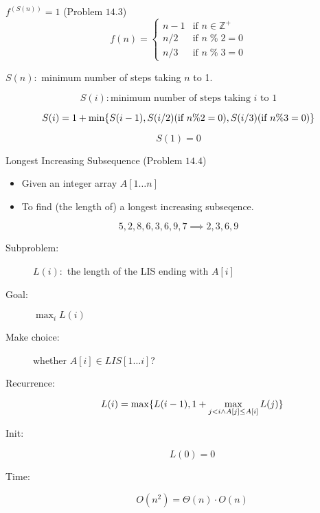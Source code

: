 
\begin{frame}{}
  \centerline{}
\end{frame}

\begin{frame}{}
  \begin{exampleblock}{$f^{(S(n))} = 1$ (Problem $14.3$)}
	\begin{displaymath}
	  f(n) = \begin{cases}
		n - 1 & \text{if } n \in \mathbb{Z}^{+} \\
		n / 2 & \text{if } n \;\%\; 2 = 0 \\
		n / 3 & \text{if } n \;\%\; 3 = 0
	  \end{cases}
	\end{displaymath}

	\centerline{$S(n):$ minimum number of steps taking $n$ to 1.}
  \end{exampleblock}

  \pause
  \[
	S(i): \text{minimum number of steps taking } i \text{ to } 1
  \]

  \pause
  \[
	S(i) = 1 + \min \{S(i-1), S(i/2) (\text{if } n\%2 = 0), S(i/3) (\text{if } n\%3 = 0)\}
  \]

  \[
	S(1) = 0
  \]
\end{frame}

\begin{frame}{}
  \begin{exampleblock}{Longest Increasing Subsequence (Problem $14.4$)}
    \begin{itemize}
      \item Given an integer array $A[1 \ldots n]$
      \item To find (the length of) a longest increasing subseqence.
    \end{itemize}
  \end{exampleblock}

  \[
    5,2,8,6,3,6,9,7 \implies 2, 3, 6, 9
  \]
\end{frame}

\begin{frame}{}
  \begin{description}
    \item[Subproblem:] $L(i):$ the length of the LIS ending with $A[i]$
    \item[Goal:] $\max_{i} L(i)$
      \pause
    \item[Make choice:] whether $A[i] \in LIS[1 \ldots i]$?
    \item[Recurrence:] 
      \[
	L(i) = \max \{L(i-1), 1 + \max_{j < i \land A[j] \le A[i]} L(j)\}
      \]
      \pause
    \item[Init:]
      \[
	L(0) = 0
      \]
    \item[Time:] 
      \[
	O(n^2) = \Theta(n) \cdot O(n)
      \]
  \end{description}
\end{frame}
